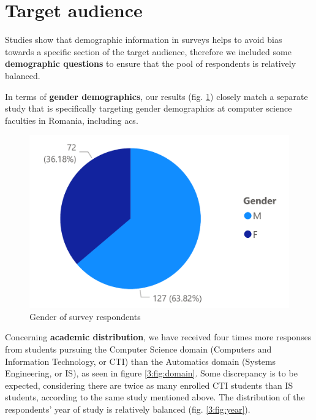 \section{Target audience} \label{3:target_audience}

Studies\cite{hammer2011importance}\cite{connelly2013demographic} show that demographic information in surveys helps to avoid bias towards a specific section of the target audience, therefore we included some \textbf{demographic questions} to ensure that the pool of respondents is relatively balanced.

In terms of \textbf{gender demographics}, our results (fig. \ref{3:fig:gender}) closely match a separate study\cite{codette2019stats} that is specifically targeting gender demographics at computer science faculties in Romania, including \acrshort{acs}.

\begin{figure}[ht]
    \centering
         \includegraphics[height=0.2\textheight]{figures/charts/survey/gender.pdf}
    \caption{Gender of survey respondents}
    \label{3:fig:gender}
\end{figure}

Concerning \textbf{academic distribution}, we have received four times more responses from students pursuing the Computer Science domain (Computers and Information Technology, or CTI) than the Automatics domain (Systems Engineering, or IS), as seen in figure \ref{3:fig:domain}. Some discrepancy is to be expected, considering there are twice as many enrolled CTI students than IS students, according to the same study\cite{codette2019stats} mentioned above. The distribution of the respondents' year of study is relatively balanced (fig. \ref{3:fig:year}).

